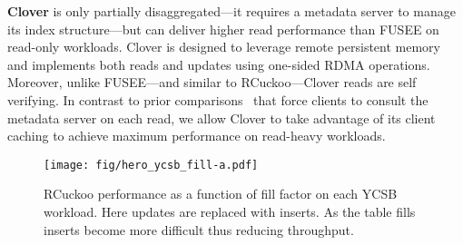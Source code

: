 \textbf{Clover} is only partially disaggregated---it requires a
metadata server to manage its index structure---but can deliver higher
read performance than FUSEE on read-only workloads.  Clover is
designed to leverage remote persistent memory and implements both
reads and updates using one-sided RDMA operations.  Moreover, unlike
FUSEE---and similar to RCuckoo---Clover reads are self verifying.
In contrast to prior comparisons~\cite{fusee} that force
clients to consult the metadata server on each read, we allow Clover
to take advantage of its client caching to achieve maximum performance
on read-heavy workloads.

\begin{figure}
  \center
  \texttt{[image: fig/hero\_ycsb\_fill-a.pdf]}
  \caption{RCuckoo performance as a function of fill factor on each YCSB workload. Here updates are replaced with inserts. As the table fills inserts become more difficult thus reducing throughput.}
  \label{fig:ycsb_fill-a}
\end{figure}



